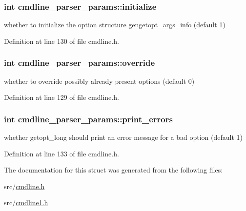 \hypertarget{structcmdline__parser__params_a97ed8a6eabd39291ae7d73f273e12c11}{
\subsubsection[{initialize}]{\setlength{\rightskip}{0pt plus 5cm}int cmdline\+\_\+parser\+\_\+params\+::initialize}}\label{structcmdline__parser__params_a97ed8a6eabd39291ae7d73f273e12c11}


whether to initialize the option structure \hyperlink{structgengetopt__args__info}{gengetopt\+\_\+args\+\_\+info} (default 1) 



Definition at line 130 of file cmdline.\+h.

\hypertarget{structcmdline__parser__params_ad3ff9d69146e69a47506782197b5675c}{
\subsubsection[{override}]{\setlength{\rightskip}{0pt plus 5cm}int cmdline\+\_\+parser\+\_\+params\+::override}}\label{structcmdline__parser__params_ad3ff9d69146e69a47506782197b5675c}


whether to override possibly already present options (default 0) 



Definition at line 129 of file cmdline.\+h.

\hypertarget{structcmdline__parser__params_a3236f066777488e8502abe05ccd24455}{
\subsubsection[{print\+\_\+errors}]{\setlength{\rightskip}{0pt plus 5cm}int cmdline\+\_\+parser\+\_\+params\+::print\+\_\+errors}}\label{structcmdline__parser__params_a3236f066777488e8502abe05ccd24455}


whether getopt\+\_\+long should print an error message for a bad option (default 1) 



Definition at line 133 of file cmdline.\+h.



The documentation for this struct was generated from the following files\+:\begin{DoxyCompactItemize}
\item 
src/\hyperlink{cmdline_8h}{cmdline.\+h}\item 
src/\hyperlink{cmdline1_8h}{cmdline1.\+h}\end{DoxyCompactItemize}
